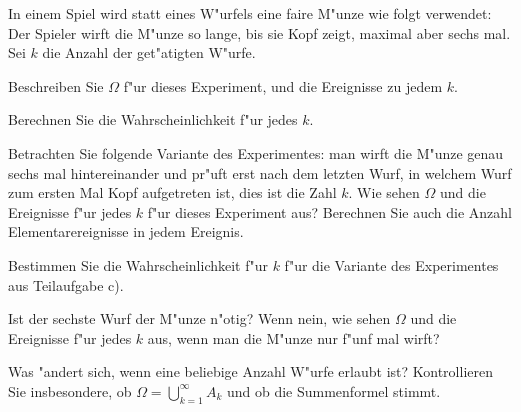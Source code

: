 In einem Spiel wird statt eines W"urfels eine faire M"unze wie folgt verwendet:
Der Spieler wirft die M"unze so lange, bis sie Kopf zeigt, maximal aber sechs mal.
Sei $k$ die Anzahl der get"atigten W"urfe.
\begin{teilaufgaben}
\item
Beschreiben Sie $\Omega$ f"ur dieses Experiment, und die Ereignisse zu jedem $k$.
\item
Berechnen Sie die Wahrscheinlichkeit f"ur jedes $k$.
\item
Betrachten Sie folgende Variante des Experimentes: man wirft die M"unze genau
sechs mal hintereinander und pr"uft erst nach dem letzten Wurf, in welchem Wurf
zum ersten Mal Kopf aufgetreten ist, dies ist die Zahl $k$.
Wie sehen $\Omega$ und die Ereignisse f"ur jedes $k$ f"ur dieses Experiment aus?
Berechnen Sie auch die Anzahl Elementarereignisse in jedem Ereignis.
\item 
Bestimmen Sie die Wahrscheinlichkeit f"ur $k$ f"ur die Variante des Experimentes
aus Teilaufgabe c).
\item
Ist der sechste Wurf der M"unze n"otig? Wenn nein, wie sehen $\Omega$ und die
Ereignisse f"ur jedes $k$ aus, wenn man die M"unze nur f"unf mal wirft?
\item
Was "andert sich, wenn eine beliebige Anzahl W"urfe erlaubt ist?
Kontrollieren Sie insbesondere, ob $\Omega=\bigcup_{k=1}^\infty A_k$
und ob die Summenformel stimmt.
\end{teilaufgaben}

